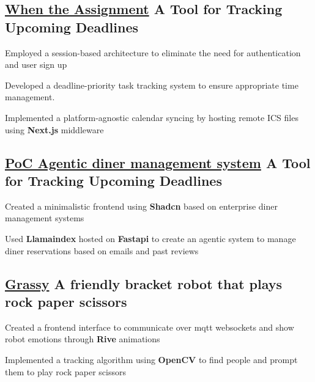 \subsection{\href{https://mcwta.vercel.app/}{When the Assignment} \textbar{} A Tool for Tracking Upcoming Deadlines}
\begin{zitemize}
    \item Employed a session-based architecture to eliminate the need for authentication and user sign up
    \item Developed a deadline-priority task tracking system to ensure appropriate time management.
    \item Implemented a platform-agnostic calendar syncing by hosting remote ICS files using \textbf{Next.js} middleware
\end{zitemize}

\vspace{0.3cm}
\subsection{\href{https://agentic-dining.vercel.app/}{PoC Agentic diner management system} \textbar{} A Tool for Tracking Upcoming Deadlines}
\begin{zitemize}
    \item Created a minimalistic frontend using \textbf{Shadcn} based on enterprise diner management systems
    \item Used \textbf{Llamaindex} hosted on \textbf{Fastapi} to create an agentic system to manage diner reservations based on emails and past reviews
\end{zitemize}


\vspace{0.3cm}\subsection{\href{https://github.com/arian81/bracket-bot-controller}{Grassy} \textbar{} A friendly bracket robot that plays rock paper scissors }
\begin{zitemize}
    \item Created a frontend interface to communicate over mqtt websockets and show robot emotions through \textbf{Rive} animations
    \item Implemented a tracking algorithm using \textbf{OpenCV} to find people and prompt them to play rock paper scissors
\end{zitemize}



